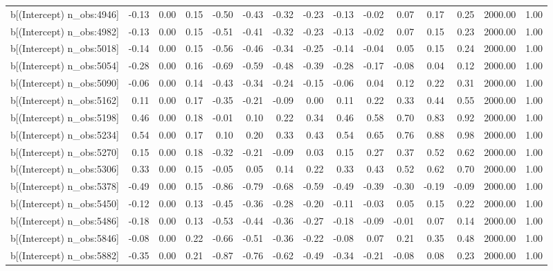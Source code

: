 \begin{table}[ht]
\begin{tabular}{rrrrrrrrrrrrrrr}
  b[(Intercept) n\_obs:4946] & -0.13 & 0.00 & 0.15 & -0.50 & -0.43 & -0.32 & -0.23 & -0.13 & -0.02 & 0.07 & 0.17 & 0.25 & 2000.00 & 1.00 \\ 
  b[(Intercept) n\_obs:4982] & -0.13 & 0.00 & 0.15 & -0.51 & -0.41 & -0.32 & -0.23 & -0.13 & -0.02 & 0.07 & 0.15 & 0.23 & 2000.00 & 1.00 \\ 
  b[(Intercept) n\_obs:5018] & -0.14 & 0.00 & 0.15 & -0.56 & -0.46 & -0.34 & -0.25 & -0.14 & -0.04 & 0.05 & 0.15 & 0.24 & 2000.00 & 1.00 \\ 
  b[(Intercept) n\_obs:5054] & -0.28 & 0.00 & 0.16 & -0.69 & -0.59 & -0.48 & -0.39 & -0.28 & -0.17 & -0.08 & 0.04 & 0.12 & 2000.00 & 1.00 \\ 
  b[(Intercept) n\_obs:5090] & -0.06 & 0.00 & 0.14 & -0.43 & -0.34 & -0.24 & -0.15 & -0.06 & 0.04 & 0.12 & 0.22 & 0.31 & 2000.00 & 1.00 \\ 
  b[(Intercept) n\_obs:5162] & 0.11 & 0.00 & 0.17 & -0.35 & -0.21 & -0.09 & 0.00 & 0.11 & 0.22 & 0.33 & 0.44 & 0.55 & 2000.00 & 1.00 \\ 
  b[(Intercept) n\_obs:5198] & 0.46 & 0.00 & 0.18 & -0.01 & 0.10 & 0.22 & 0.34 & 0.46 & 0.58 & 0.70 & 0.83 & 0.92 & 2000.00 & 1.00 \\ 
  b[(Intercept) n\_obs:5234] & 0.54 & 0.00 & 0.17 & 0.10 & 0.20 & 0.33 & 0.43 & 0.54 & 0.65 & 0.76 & 0.88 & 0.98 & 2000.00 & 1.00 \\ 
  b[(Intercept) n\_obs:5270] & 0.15 & 0.00 & 0.18 & -0.32 & -0.21 & -0.09 & 0.03 & 0.15 & 0.27 & 0.37 & 0.52 & 0.62 & 2000.00 & 1.00 \\ 
  b[(Intercept) n\_obs:5306] & 0.33 & 0.00 & 0.15 & -0.05 & 0.05 & 0.14 & 0.22 & 0.33 & 0.43 & 0.52 & 0.62 & 0.70 & 2000.00 & 1.00 \\ 
  b[(Intercept) n\_obs:5378] & -0.49 & 0.00 & 0.15 & -0.86 & -0.79 & -0.68 & -0.59 & -0.49 & -0.39 & -0.30 & -0.19 & -0.09 & 2000.00 & 1.00 \\ 
  b[(Intercept) n\_obs:5450] & -0.12 & 0.00 & 0.13 & -0.45 & -0.36 & -0.28 & -0.20 & -0.11 & -0.03 & 0.05 & 0.15 & 0.22 & 2000.00 & 1.00 \\ 
  b[(Intercept) n\_obs:5486] & -0.18 & 0.00 & 0.13 & -0.53 & -0.44 & -0.36 & -0.27 & -0.18 & -0.09 & -0.01 & 0.07 & 0.14 & 2000.00 & 1.00 \\ 
  b[(Intercept) n\_obs:5846] & -0.08 & 0.00 & 0.22 & -0.66 & -0.51 & -0.36 & -0.22 & -0.08 & 0.07 & 0.21 & 0.35 & 0.48 & 2000.00 & 1.00 \\ 
  b[(Intercept) n\_obs:5882] & -0.35 & 0.00 & 0.21 & -0.87 & -0.76 & -0.62 & -0.49 & -0.34 & -0.21 & -0.08 & 0.08 & 0.23 & 2000.00 & 1.00 \\ 

\end{tabular}
\end{table}
